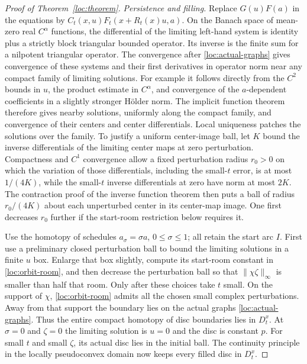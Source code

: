 \begin{proof}[Proof of Theorem~\ref{loc:theorem}]
\emph{Persistence and filling.}
Replace $G(u)F(a)$ in the equations by
$C_t(x,u)F_t(x+R_t(x)u,a)$.  On the Banach space of mean-zero real
$C^\alpha$ functions, the differential of the limiting left-hand
system is identity plus a strictly block triangular bounded operator.
Its inverse is the finite sum for a nilpotent triangular operator.
The convergence after \eqref{loc:actual-graphs} gives convergence of
these systems and their first derivatives in operator norm near any
compact family of limiting solutions.  For example it follows
directly from the $C^2$ bounds in $u$, the product estimate in
$C^\alpha$, and convergence of the $a$-dependent coefficients in a
slightly stronger H\"older norm.  The implicit function theorem
therefore gives nearby solutions, uniformly along the compact
family, and convergence of their centers and center differentials.
Local uniqueness patches the solutions over the family.  To justify a
uniform center-image ball, let $K$ bound the inverse differentials of
the limiting center maps at zero perturbation.  Compactness and $C^1$
convergence allow a fixed perturbation radius $r_0>0$ on which the
variation of those differentials, including the small-$t$ error, is
at most $1/(4K)$, while the small-$t$ inverse differentials at zero
have norm at most $2K$.  The contraction proof of the inverse function
theorem then puts a ball of radius $r_0/(4K)$ about each unperturbed
center in its center-map image.  One first decreases $r_0$ further if
the start-room restriction below requires it.

Use the homotopy of schedules $a_\sigma=\sigma a$, $0\leq\sigma\leq1$;
all retain the start arc $I$.  First use a preliminary closed
perturbation ball to bound the limiting solutions in a finite $u$ box.
Enlarge that box slightly, compute its start-room constant in
\eqref{loc:orbit-room}, and then decrease the perturbation ball so that
$\|\chi\zeta\|_\infty$ is smaller than half that room.  Only after these
choices take $t$ small.
On the support of $\chi$, \eqref{loc:orbit-room} admits all the chosen
small complex perturbations.  Away from that support the boundary
lies on the actual graphs \eqref{loc:actual-graphs}.  Thus the entire
compact homotopy of disc boundaries lies in $D_t^x$.  At $\sigma=0$
and $\zeta=0$ the limiting solution is $u=0$ and the disc is constant
$p$.  For small $t$ and small $\zeta$, its actual disc lies in the
initial ball.  The continuity principle in the locally pseudoconvex
domain now keeps every filled disc in $D_t^x$.


\end{proof}
